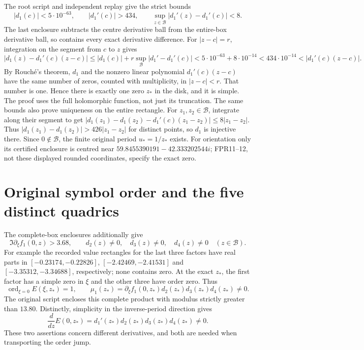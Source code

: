 \documentclass[11pt]{article}
\newcommand{\ord}{\operatorname{ord}}
\begin{document}
The root script and independent replay give the strict bounds
\[
 |d_1(c)|<5\cdot10^{-63},\qquad |d_1'(c)|>434,
 \qquad \sup_{z\in\mathcal B}|d_1'(z)-d_1'(c)|<8.
 \tag{FPR16}
\]
The last enclosure subtracts the centre derivative ball from
the entire-box derivative ball, so contains every exact
derivative difference. For $|z-c|=r$, integration on the segment
from $c$ to $z$ gives
\[
 |d_1(z)-d_1'(c)(z-c)|
 \le |d_1(c)|+r\sup_{\mathcal B}|d_1'-d_1'(c)|
 <5\cdot10^{-63}+8\cdot10^{-14}
 <434\cdot10^{-14}<|d_1'(c)(z-c)|.
 \tag{FPR17}
\]
By Rouch\'e's theorem, $d_1$ and the nonzero linear polynomial
$d_1'(c)(z-c)$ have the same number of zeros, counted with
multiplicity, in $|z-c|<r$. That number is one. Hence there is
exactly one zero $z_*$ in the disk, and it is simple. The proof
uses the full holomorphic function, not just its truncation.
The same bounds also prove uniqueness on the entire rectangle.
For $z_1,z_2\in\mathcal B$, integrate along their segment to get
$|d_1(z_1)-d_1(z_2)-d_1'(c)(z_1-z_2)|\le8|z_1-z_2|$.
Thus $|d_1(z_1)-d_1(z_2)|>426|z_1-z_2|$ for distinct points,
so $d_1$ is injective there.
Since $0\notin\mathcal B$, the finite original period
$u_*=1/z_*$ exists. For orientation only its certified enclosure
is centred near $59.8455390191-42.333202544i$; FPR11--12, not
these displayed rounded coordinates, specify the exact zero.

\section{Original symbol order and the five distinct quadrics}
The complete-box enclosures additionally give
\[
 \Im\partial_\xi f_1(0,z)>3.68,\qquad
 d_2(z)\ne0,\quad d_3(z)\ne0,\quad d_4(z)\ne0
 \quad(z\in\mathcal B).
 \tag{FPR18}
\]
For example the recorded value rectangles for the last three
factors have real parts in
$[-0.23174,-0.22826]$, $[-2.42469,-2.41531]$ and
$[-3.35312,-3.34688]$, respectively; none contains zero.
At the exact $z_*$, the first factor has a simple zero in $\xi$
and the other three have order zero. Thus
\[
 \ord_{\xi=0}E(\xi,z_*)=1,\qquad
 \mu_1(z_*)=\partial_\xi f_1(0,z_*)
                    d_2(z_*)d_3(z_*)d_4(z_*)\ne0.
 \tag{FPR19}
\]
The original script encloses this complete product with modulus
strictly greater than $13.80$. Distinctly, simplicity in the
inverse-period direction gives
\[
 \frac{d}{dz}E(0,z_*)=d_1'(z_*)d_2(z_*)d_3(z_*)d_4(z_*)\ne0.
 \tag{FPR20}
\]
These two assertions concern different derivatives, and both
are needed when transporting the order jump.
\end{document}
